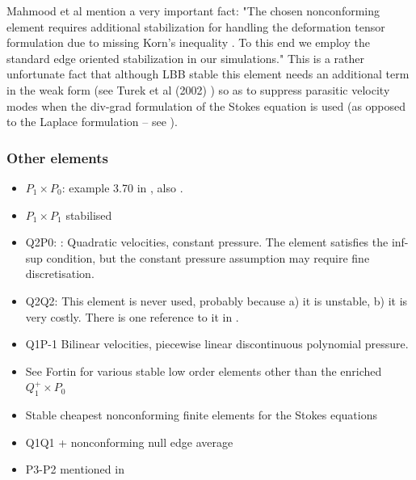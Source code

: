 Mahmood et al \cite{maky17} mention a very important fact: "The chosen nonconforming element requires
additional stabilization for handling the deformation tensor formulation due to missing Korn’s inequality 
\cite{horg95,knob00}.
To this end we employ the standard edge oriented stabilization \cite{tuos02,tuou07} in our simulations."
This is a rather unfortunate fact that although LBB stable this element needs an additional 
term in the weak form (see Turek et al (2002) \cite{tuos02}) 
so as to suppress parasitic velocity modes when the div-grad formulation 
of the Stokes equation is used (as opposed to the Laplace formulation -- see \cite[Section 6.5.2]{dohu03}).












\subsubsection{Other elements}

\begin{itemize}
\item $P_1\times P_0$: example 3.70 in \cite{john16}, also \cite{john98}. 
\item $P_1\times P_1$ stabilised \cite{nosi98,tasu00}
\item Q2P0: : 
Quadratic velocities, constant pressure. The element satisfies the inf-sup condition, but the constant pressure assumption may require fine discretisation.

\item Q2Q2: This element is never used, probably because a) it is unstable, b) it is very costly. 
There is one reference to it in \cite{hufb86}.
\item Q1P-1 Bilinear velocities,  piecewise linear discontinuous polynomial pressure.
\item See Fortin \cite{fort81} for various stable low order elements other than the enriched $Q_1^+ \times P_0$
\item Stable cheapest nonconforming finite elements for the Stokes equations \cite{kiys16}
\item Q1Q1 + nonconforming null edge average \cite{fros07}
\item P3-P2 mentioned in \cite{sten90}   

\end{itemize}

